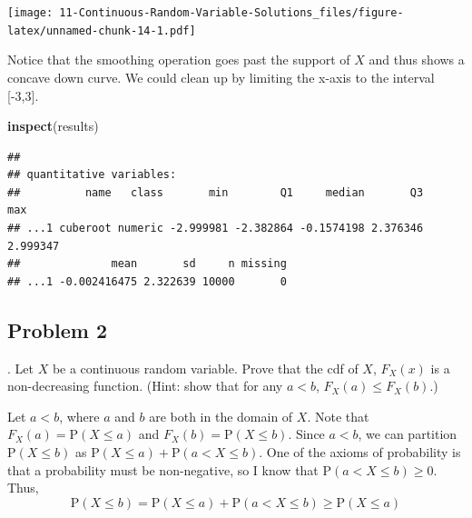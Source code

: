 \documentclass[
]{book}
\newenvironment{Shaded}{\begin{snugshade}}{\end{snugshade}}
\newcommand{\DataTypeTok}[1]{\textcolor[rgb]{0.13,0.29,0.53}{#1}}
\newcommand{\KeywordTok}[1]{\textcolor[rgb]{0.13,0.29,0.53}{\textbf{#1}}}
\newcommand{\NormalTok}[1]{#1}
\newcommand{\OperatorTok}[1]{\textcolor[rgb]{0.81,0.36,0.00}{\textbf{#1}}}
\newcommand{\StringTok}[1]{\textcolor[rgb]{0.31,0.60,0.02}{#1}}
\begin{document}
\begin{Shaded}
\end{Shaded}

\texttt{[image: 11-Continuous-Random-Variable-Solutions\_files/figure-latex/unnamed-chunk-14-1.pdf]}

Notice that the smoothing operation goes past the support of \(X\) and thus shows a concave down curve. We could clean up by limiting the x-axis to the interval {[}-3,3{]}.

\begin{Shaded}
\begin{Highlighting}[]
\KeywordTok{inspect}\NormalTok{(results)}
\end{Highlighting}
\end{Shaded}

\begin{verbatim}
## 
## quantitative variables:  
##          name   class       min        Q1     median       Q3      max
## ...1 cuberoot numeric -2.999981 -2.382864 -0.1574198 2.376346 2.999347
##              mean       sd     n missing
## ...1 -0.002416475 2.322639 10000       0
\end{verbatim}

\newpage

\hypertarget{problem-2-10}{%
\subsection{Problem 2}\label{problem-2-10}}

. Let \(X\) be a continuous random variable. Prove that the cdf of \(X\), \(F_X(x)\) is a non-decreasing function. (Hint: show that for any \(a < b\), \(F_X(a) \leq F_X(b)\).)

Let \(a<b\), where \(a\) and \(b\) are both in the domain of \(X\). Note that \(F_X(a)=\mbox{P}(X\leq a)\) and \(F_X(b)=\mbox{P}(X\leq b)\). Since \(a<b\), we can partition \(\mbox{P}(X\leq b)\) as \(\mbox{P}(X\leq a)+\mbox{P}(a < X \leq b)\). One of the axioms of probability is that a probability must be non-negative, so I know that \(\mbox{P}(a < X \leq b)\geq 0\). Thus,
\[
\mbox{P}(X\leq b)=\mbox{P}(X\leq a)+\mbox{P}(a < X \leq b) \geq \mbox{P}(X\leq a)
\]
\end{document}
